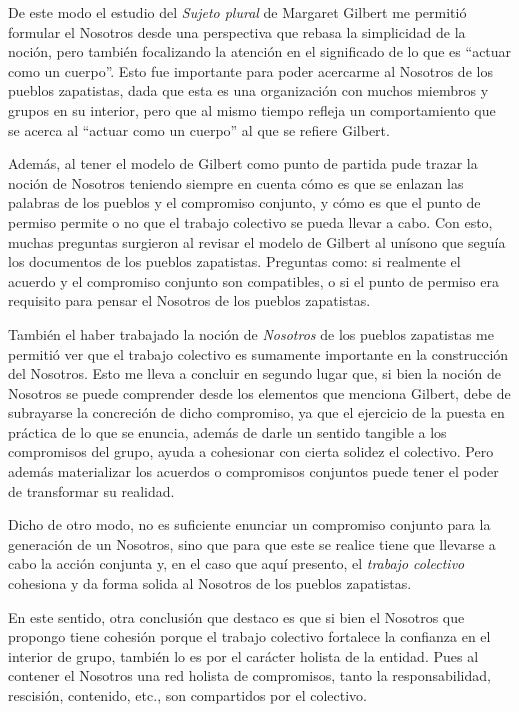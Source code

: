 \documentclass[oneside]{book}
\begin{document}
De este modo el estudio del \textit{Sujeto plural} de Margaret Gilbert me permitió formular el Nosotros desde una perspectiva que rebasa la simplicidad de la noción, pero también focalizando la atención en el significado de lo que es “actuar como un cuerpo”. Esto fue importante para poder acercarme al Nosotros de los pueblos zapatistas, dada que esta es una organización con muchos miembros y grupos en su interior, pero que al mismo tiempo refleja un comportamiento que se acerca al “actuar como un cuerpo” al que se refiere Gilbert.

Además, al tener el modelo de Gilbert como punto de partida pude trazar la noción de Nosotros teniendo siempre en cuenta cómo es que se enlazan las palabras de los pueblos y el compromiso conjunto, y cómo es que el punto de permiso permite o no que el trabajo colectivo se pueda llevar a cabo. Con esto, muchas preguntas surgieron al revisar el modelo de Gilbert al unísono que seguía los documentos de los pueblos zapatistas. Preguntas como: si realmente el acuerdo y el compromiso conjunto son compatibles, o si el punto de permiso era requisito para pensar el Nosotros de los pueblos zapatistas.

También el haber trabajado la noción de \textit{Nosotros} de los pueblos zapatistas me permitió ver que el trabajo colectivo es sumamente importante en la construcción del Nosotros. Esto me lleva a concluir en segundo lugar que, si bien la noción de Nosotros se puede comprender desde los elementos que menciona Gilbert, debe de subrayarse la concreción de dicho compromiso, ya que el ejercicio de la puesta en práctica de lo que se enuncia, además de darle un sentido tangible a los compromisos del grupo, ayuda a cohesionar con cierta solidez el colectivo. Pero además materializar los acuerdos o compromisos conjuntos puede tener el poder de transformar su realidad.

Dicho de otro modo, no es suficiente enunciar un compromiso conjunto para la generación de un Nosotros, sino que para que este se realice tiene que llevarse a cabo la acción conjunta y, en el caso que aquí presento, el \textit{trabajo colectivo} cohesiona y da forma solida al Nosotros de los pueblos zapatistas.

En este sentido, otra conclusión que destaco es que si bien el Nosotros que propongo tiene cohesión porque el trabajo colectivo fortalece la confianza en el interior de grupo, también lo es por el carácter holista de la entidad. Pues al contener el Nosotros una red holista de compromisos, tanto la responsabilidad, rescisión, contenido, etc., son compartidos por el colectivo.
\end{document}
